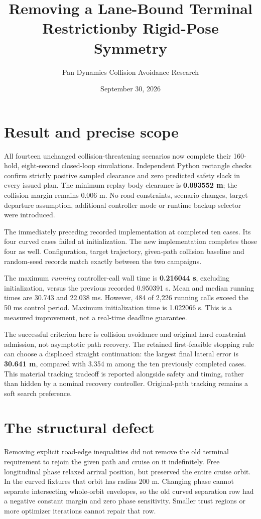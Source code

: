 \documentclass[11pt]{article}
\title{Removing a Lane-Bound Terminal Restriction\newline by Rigid-Pose Symmetry}
\author{Pan Dynamics Collision Avoidance Research}
\date{September 30, 2026}
\begin{document}
\maketitle

\section{Result and precise scope}
All fourteen unchanged collision-threatening scenarios now complete their
160-hold, eight-second closed-loop simulations. Independent Python rectangle
checks confirm strictly positive sampled clearance and zero predicted safety
slack in every issued plan. The minimum replay body clearance is
\textbf{0.093552 m}; the collision margin remains 0.006 m. No road constraints,
scenario changes, target-departure assumption, additional controller mode or
runtime backup selector were introduced.

The immediately preceding recorded implementation at
 completed ten cases. Its four
curved cases failed at initialization. The new implementation completes those
four as well. Configuration, target trajectory, given-path collision baseline
and random-seed records match exactly between the two campaigns.

The maximum \emph{running} controller-call wall time is \textbf{0.216044 s},
excluding initialization, versus the previous recorded 0.950391 s. Mean and
median running times are 30.743 and 22.038 ms. However, 484 of 2,226 running
calls exceed the 50 ms control period. Maximum initialization time is
1.022066 s. This is a measured improvement, not a real-time deadline guarantee.

The successful criterion here is collision avoidance and original hard
constraint admission, not asymptotic path recovery. The retained
first-feasible stopping rule can choose a displaced straight continuation:
the largest final lateral error is \textbf{30.641 m}, compared with 3.354 m
among the ten previously completed cases. This material tracking tradeoff is
reported alongside safety and timing, rather than hidden by a nominal recovery
controller. Original-path tracking remains a soft search preference.

\section{The structural defect}
Removing explicit road-edge inequalities did not remove the old terminal
requirement to rejoin the given path and cruise on it indefinitely. Free
longitudinal phase relaxed arrival position, but preserved the entire cruise
orbit. In the curved fixtures that orbit has radius 200 m. Changing phase
cannot separate intersecting whole-orbit envelopes, so the old curved
separation row had a negative constant margin and zero phase sensitivity.
Smaller trust regions or more optimizer iterations cannot repair that row.
\end{document}

